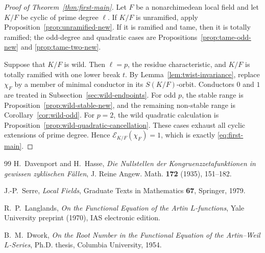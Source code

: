 \documentclass[11pt]{amsart}
\theoremstyle{definition}
\theoremstyle{remark}
\newcommand{\Err}{\mathcal E}
\begin{document}
\begin{proof}[Proof of Theorem~\ref{thm:first-main}]
Let $F$ be a nonarchimedean local field and let $K/F$ be cyclic of
prime degree $\ell$.  If $K/F$ is unramified, apply
Proposition~\ref{prop:unramified-new}.  If it is ramified and tame,
then it is totally ramified; the odd-degree and quadratic cases are
Propositions~\ref{prop:tame-odd-new} and
\ref{prop:tame-two-new}.

Suppose that $K/F$ is wild.  Then $\ell=p$, the residue
characteristic, and $K/F$ is totally ramified with one lower break
$t$.  By Lemma~\ref{lem:twist-invariance}, replace $\chi_F$ by a
member of minimal conductor in its $S(K/F)$-orbit.  Conductors $0$ and
$1$ are treated in Subsection~\ref{sec:wild-endpoints}.  For odd $p$,
the stable range is Proposition~\ref{prop:wild-stable-new}, and the
remaining non-stable range is Corollary~\ref{cor:wild-odd}.  For
$p=2$, the wild quadratic calculation is
Proposition~\ref{prop:wild-quadratic-cancellation}.  These cases
exhaust all cyclic extensions of prime degree.  Hence
$\Err_{K/F}(\chi_F)=1$, which is exactly
\eqref{eq:first-main}.
\end{proof}


\begin{thebibliography}{99}
H.~Davenport and H.~Hasse,
\emph{Die Nullstellen der Kongruenzzetafunktionen in gewissen
zyklischen F\"allen},
J. Reine Angew. Math. \textbf{172} (1935), 151--182.

J.-P.~Serre,
\emph{Local Fields},
Graduate Texts in Mathematics \textbf{67}, Springer, 1979.

R.~P.~Langlands,
\emph{On the Functional Equation of the Artin $L$-functions},
Yale University preprint (1970), IAS electronic edition.

B.~M.~Dwork,
\emph{On the Root Number in the Functional Equation of the Artin--Weil
$L$-Series}, Ph.D. thesis, Columbia University, 1954.
\end{thebibliography}
\end{document}
